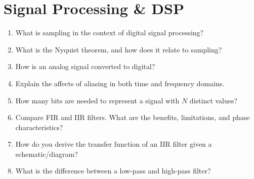 \documentclass[11pt]{article}
\begin{document}
\section{Signal Processing \& DSP}
\begin{enumerate}
    \item What is sampling in the context of digital signal processing?
    \item What is the Nyquist theorem, and how does it relate to sampling?
    \item How is an analog signal converted to digital?
    \item Explain the affects of aliasing in both time and frequency domains.
    \item How many bits are needed to represent a signal with \(N\) distinct
    values?
    \item Compare FIR and IIR filters. What are the benefits, limitations, and
    phase characteristics?
    \item How do you derive the transfer function of an IIR filter given a
    schematic/diagram?
    \item What is the difference between a low-pass and high-pass filter?
\end{enumerate}

\end{document}
